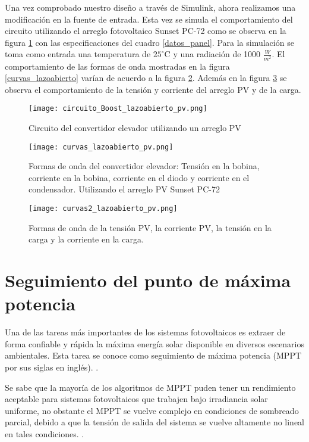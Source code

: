 \documentclass[10pt,twocolumn]{article}
\begin{document}
Una vez comprobado nuestro diseño a través de Simulink, ahora realizamos una modificación en la fuente de entrada. Esta vez se simula el comportamiento del circuito utilizando el arreglo fotovoltaico Sunset PC-72 como se observa en la figura \ref{circuito_boost_pv} con las especificaciones del cuadro \ref{datos_panel}. Para la simulación se toma como entrada una temperatura de $25^{\circ}$C y una radiación de 1000 $\frac{W}{m^2}$.
El comportamiento de las formas de onda mostradas en la figura \ref{curvas_lazoabierto} varían de acuerdo a la figura \ref{boost_pv}. Además en la figura \ref{boost2_pv} se observa el comportamiento de la tensión y corriente del arreglo PV y de la carga.



\begin{figure}[h!]
	\centering
	\texttt{[image: circuito\_Boost\_lazoabierto\_pv.png]}
	\caption{Circuito del convertidor elevador utilizando un arreglo PV}
	\label{circuito_boost_pv}
\end{figure}

 \begin{figure}[h!]
	\centering
	\texttt{[image: curvas\_lazoabierto\_pv.png]}
	\caption{Formas de onda del convertidor elevador: Tensión en la bobina, corriente en la bobina, corriente en el diodo y corriente en el condensador. Utilizando el arreglo PV Sunset PC-72}
	\label{boost_pv}
\end{figure}

\begin{figure}[h!]
	\centering
	\texttt{[image: curvas2\_lazoabierto\_pv.png]}
	\caption{Formas de onda de la tensión PV, la corriente PV, la tensión en la carga y la corriente en la carga.}
	\label{boost2_pv}
\end{figure}

\section{Seguimiento del punto de máxima potencia}

Una de las tareas más importantes de los sistemas fotovoltaicos es extraer de forma confiable y rápida la máxima energía solar disponible en diversos escenarios ambientales. Esta tarea se conoce como seguimiento de máxima potencia (MPPT por sus siglas en inglés). \cite{motahhir2020most}.

Se sabe que la mayoría de los algoritmos de MPPT puden tener un rendimiento aceptable para sistemas fotovoltaicos que trabajen bajo irradiancia solar uniforme, no obstante el MPPT se vuelve complejo en condiciones de sombreado parcial, debido a que la tensión de salida del sistema se vuelve altamente no lineal en tales condiciones. \cite{yang2020comprehensive}.
\end{document}
